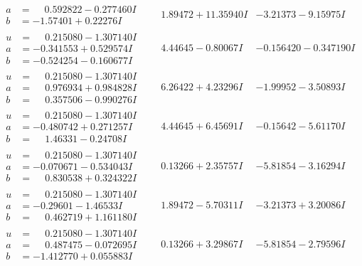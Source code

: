 \documentclass[1p]{elsarticle_modified}
\theoremstyle{definition}
\begin{document}
$$\begin{array}{c|c|c}
\begin{aligned}
a &= \phantom{-}0.592822 - 0.277460 I \\
b &= -1.57401 + 0.22276 I\end{aligned}
 & \phantom{-}1.89472 + 11.35940 I & -3.21373 - 9.15975 I \\ \hline\begin{aligned}
u &= \phantom{-}0.215080 - 1.307140 I \\
a &= -0.341553 + 0.529574 I \\
b &= -0.524254 - 0.160677 I\end{aligned}
 & \phantom{-}4.44645 - 0.80067 I & -0.156420 - 0.347190 I \\ \hline\begin{aligned}
u &= \phantom{-}0.215080 - 1.307140 I \\
a &= \phantom{-}0.976934 + 0.984828 I \\
b &= \phantom{-}0.357506 - 0.990276 I\end{aligned}
 & \phantom{-}6.26422 + 4.23296 I & -1.99952 - 3.50893 I \\ \hline\begin{aligned}
u &= \phantom{-}0.215080 - 1.307140 I \\
a &= -0.480742 + 0.271257 I \\
b &= \phantom{-}1.46331 - 0.24708 I\end{aligned}
 & \phantom{-}4.44645 + 6.45691 I & -0.15642 - 5.61170 I \\ \hline\begin{aligned}
u &= \phantom{-}0.215080 - 1.307140 I \\
a &= -0.070671 - 0.534043 I \\
b &= \phantom{-}0.830538 + 0.324322 I\end{aligned}
 & \phantom{-}0.13266 + 2.35757 I & -5.81854 - 3.16294 I \\ \hline\begin{aligned}
u &= \phantom{-}0.215080 - 1.307140 I \\
a &= -0.29601 - 1.46533 I \\
b &= \phantom{-}0.462719 + 1.161180 I\end{aligned}
 & \phantom{-}1.89472 - 5.70311 I & -3.21373 + 3.20086 I \\ \hline\begin{aligned}
u &= \phantom{-}0.215080 - 1.307140 I \\
a &= \phantom{-}0.487475 - 0.072695 I \\
b &= -1.412770 + 0.055883 I\end{aligned}
 & \phantom{-}0.13266 + 3.29867 I & -5.81854 - 2.79596 I \\ \hline\begin{aligned}

\end{aligned}
\end{array}$$
\end{document}
